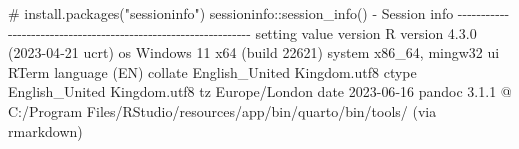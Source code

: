 \documentclass[
  10pt,
  a4paper,
]{book}
\newenvironment{Shaded}{\begin{snugshade}}{\end{snugshade}}
\newcommand{\CommentTok}[1]{\textcolor[rgb]{0.37,0.37,0.37}{#1}}
\newcommand{\DecValTok}[1]{\textcolor[rgb]{0.68,0.00,0.00}{#1}}
\newcommand{\ErrorTok}[1]{\textcolor[rgb]{0.68,0.00,0.00}{#1}}
\newcommand{\FloatTok}[1]{\textcolor[rgb]{0.68,0.00,0.00}{#1}}
\newcommand{\FunctionTok}[1]{\textcolor[rgb]{0.28,0.35,0.67}{#1}}
\newcommand{\NormalTok}[1]{\textcolor[rgb]{0.00,0.46,0.62}{#1}}
\newcommand{\SpecialCharTok}[1]{\textcolor[rgb]{0.37,0.37,0.37}{#1}}
\begin{document}
\begin{Shaded}
\begin{Highlighting}[]
\CommentTok{\# install.packages("sessioninfo")}
\NormalTok{sessioninfo}\SpecialCharTok{::}\FunctionTok{session\_info}\NormalTok{()}
\SpecialCharTok{{-}}\NormalTok{ Session info }\SpecialCharTok{{-}{-}{-}{-}{-}{-}{-}{-}{-}{-}{-}{-}{-}{-}{-}{-}{-}{-}{-}{-}{-}{-}{-}{-}{-}{-}{-}{-}{-}{-}{-}{-}{-}{-}{-}{-}{-}{-}{-}{-}{-}{-}{-}{-}{-}{-}{-}{-}{-}{-}{-}{-}{-}{-}{-}{-}{-}{-}{-}{-}{-}{-}{-}}
\NormalTok{ setting  value}
\NormalTok{ version  R version }\DecValTok{4}\NormalTok{.}\FloatTok{3.0}\NormalTok{ (}\DecValTok{2023{-}04{-}21}\NormalTok{ ucrt)}
\NormalTok{ os       Windows }\DecValTok{11} \FunctionTok{x64}\NormalTok{ (build }\DecValTok{22621}\NormalTok{)}
\NormalTok{ system   x86\_64, mingw32}
\NormalTok{ ui       RTerm}
 \FunctionTok{language}\NormalTok{ (EN)}
\NormalTok{ collate  English\_United Kingdom.utf8}
\NormalTok{ ctype    English\_United Kingdom.utf8}
\NormalTok{ tz       Europe}\SpecialCharTok{/}\NormalTok{London}
\NormalTok{ date     }\DecValTok{2023{-}06{-}16}
\NormalTok{ pandoc   }\DecValTok{3}\NormalTok{.}\FloatTok{1.1} \SpecialCharTok{@}\NormalTok{ C}\SpecialCharTok{:}\ErrorTok{/}\NormalTok{Program Files}\SpecialCharTok{/}\NormalTok{RStudio}\SpecialCharTok{/}\NormalTok{resources}\SpecialCharTok{/}\NormalTok{app}\SpecialCharTok{/}\NormalTok{bin}\SpecialCharTok{/}\NormalTok{quarto}\SpecialCharTok{/}\NormalTok{bin}\SpecialCharTok{/}\NormalTok{tools}\SpecialCharTok{/}\NormalTok{ (via rmarkdown)}


\end{Highlighting}
\end{Shaded}
\end{document}
